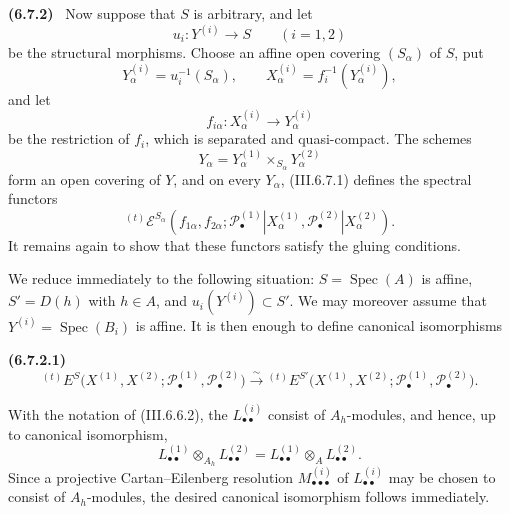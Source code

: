 \documentclass[10pt,oneside]{book}
\newcommand{\sh}[1]{\mathscr{#1}}
\newcommand{\Spec}{\operatorname{Spec}}
\newcommand{\sref}[2][]{(#2)}
\newenvironment{env}[1][]{\par\medskip\noindent\textbf{(#1)}\ }{\par}
\begin{document}
\begin{env}[6.7.2]
\label{III.6.7.2}
Now suppose that $S$ is arbitrary, and let
\[
  u_i:Y^{(i)}\longrightarrow S
  \qquad(i=1,2)
\]
be the structural morphisms.  Choose an affine open covering
$(S_\alpha)$ of $S$, put
\[
  Y_\alpha^{(i)}=u_i^{-1}(S_\alpha),
  \qquad
  X_\alpha^{(i)}=f_i^{-1}(Y_\alpha^{(i)}),
\]
and let
\[
  f_{i\alpha}:X_\alpha^{(i)}\longrightarrow Y_\alpha^{(i)}
\]
be the restriction of $f_i$, which is separated and
quasi-compact.  The schemes
\[
  Y_\alpha
  =
  Y_\alpha^{(1)}
  \times_{S_\alpha}Y_\alpha^{(2)}
\]
form an open covering of $Y$, and on every $Y_\alpha$,
\sref{III.6.7.1} defines the spectral functors
\[
  {}^{(t)}\sh E^{S_\alpha}
  \left(
    f_{1\alpha},f_{2\alpha};
    \sh P_\bullet^{(1)}|X_\alpha^{(1)},
    \sh P_\bullet^{(2)}|X_\alpha^{(2)}
  \right).
\]
It remains again to show that these functors satisfy the gluing
conditions.

We reduce immediately to the following situation:
$S=\Spec(A)$ is affine,
$S'=D(h)$ with $h\in A$, and
$u_i(Y^{(i)})\subset S'$.  We may moreover assume that
$Y^{(i)}=\Spec(B_i)$ is affine.  It is then enough to define
canonical isomorphisms
\begin{env}[6.7.2.1]
\label{III.6.7.2.1}
\[
  {}^{(t)}E^S
  \bigl(
    X^{(1)},X^{(2)};
    \sh P_\bullet^{(1)},\sh P_\bullet^{(2)}
  \bigr)
  \xrightarrow{\sim}
  {}^{(t)}E^{S'}
  \bigl(
    X^{(1)},X^{(2)};
    \sh P_\bullet^{(1)},\sh P_\bullet^{(2)}
  \bigr).
  \tag{6.7.2.1}\label{III.6.7.2.1.eq}
\]
\end{env}
With the notation of \sref{III.6.6.2}, the
$L_{\bullet\bullet}^{(i)}$ consist of $A_h$-modules, and hence,
up to canonical isomorphism,
\[
  L_{\bullet\bullet}^{(1)}
  \otimes_{A_h}L_{\bullet\bullet}^{(2)}
  =
  L_{\bullet\bullet}^{(1)}
  \otimes_A L_{\bullet\bullet}^{(2)}.
\]
Since a projective Cartan--Eilenberg resolution
$M_{\bullet\bullet\bullet}^{(i)}$ of $L_{\bullet\bullet}^{(i)}$ may be
chosen to consist of $A_h$-modules, the desired canonical
isomorphism follows immediately.
\end{env}
\end{document}
